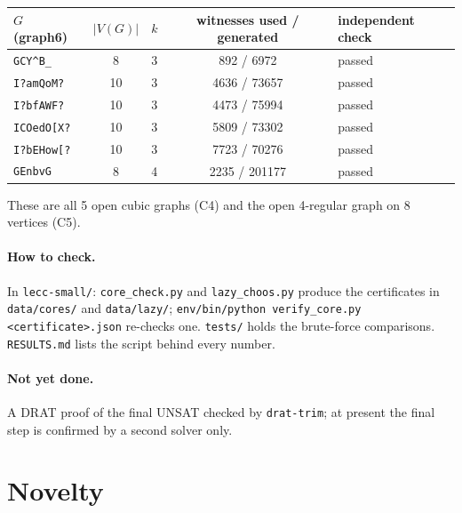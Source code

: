 \documentclass[11pt]{article}
\theoremstyle{plain}
\theoremstyle{definition}
\theoremstyle{remark}
\begin{document}
\begin{center}
\begin{tabular}{lcccl}
\toprule
$G$ (graph6) & $|V(G)|$ & $k$ & witnesses used / generated & independent check \\
\midrule
\texttt{GCY\^{}B\_} & 8 & 3 & 892 / 6972 & passed \\
\texttt{I?\textasciigrave{}amQoM?} & 10 & 3 & 4636 / 73657 & passed \\
\texttt{I?\textasciigrave{}bfAWF?} & 10 & 3 & 4473 / 75994 & passed \\
\texttt{ICOedO[X?} & 10 & 3 & 5809 / 73302 & passed \\
\texttt{I?bEHow[?} & 10 & 3 & 7723 / 70276 & passed \\
\texttt{GEnbvG} & 8 & 4 & 2235 / 201177 & passed \\
\bottomrule
\end{tabular}
\end{center}

These are all 5 open cubic graphs (C4) and the open 4-regular graph on 8 vertices (C5).

\paragraph{How to check.} In \texttt{lecc-small/}: \texttt{core\_check.py} and
\texttt{lazy\_choos.py} produce the certificates in \texttt{data/cores/} and
\texttt{data/lazy/}; \texttt{env/bin/python verify\_core.py <certificate>.json} re-checks one.
\texttt{tests/} holds the brute-force comparisons. \texttt{RESULTS.md} lists the script behind
every number.

\paragraph{Not yet done.} A DRAT proof of the final UNSAT checked by \texttt{drat-trim}; at
present the final step is confirmed by a second solver only.

\section{Novelty}
\end{document}
